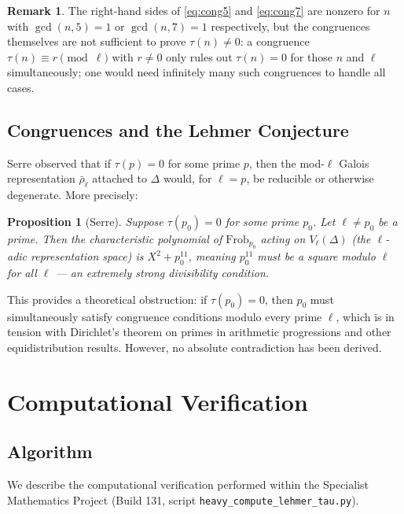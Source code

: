 \documentclass[12pt,a4paper]{amsart}
\newtheorem{proposition}[theorem]{Proposition}
\theoremstyle{definition}
\newtheorem{remark}[theorem]{Remark}
\begin{document}
\begin{remark}
  The right-hand sides of \eqref{eq:cong5} and \eqref{eq:cong7} are nonzero for
  $n$ with $\gcd(n, 5) = 1$ or $\gcd(n, 7) = 1$ respectively, but the congruences
  themselves are not sufficient to prove $\tau(n) \neq 0$: a congruence
  $\tau(n) \equiv r \pmod{\ell}$ with $r \neq 0$ only rules out $\tau(n) = 0$ for
  those $n$ and $\ell$ simultaneously; one would need infinitely many such
  congruences to handle all cases.
\end{remark}

\subsection{Congruences and the Lehmer Conjecture}

Serre \cite{Serre1987} observed that if $\tau(p) = 0$ for some prime $p$, then the
mod-$\ell$ Galois representation $\bar\rho_\ell$ attached to $\Delta$ would, for
$\ell = p$, be reducible or otherwise degenerate. More precisely:

\begin{proposition}[Serre]\label{prop:serre-galois}
  Suppose $\tau(p_0) = 0$ for some prime $p_0$. Let $\ell \neq p_0$ be a prime.
  Then the characteristic polynomial of $\mathrm{Frob}_{p_0}$ acting on
  $V_\ell(\Delta)$ (the $\ell$-adic representation space) is $X^2 + p_0^{11}$,
  meaning $p_0^{11}$ must be a square modulo $\ell$ for all $\ell$ --- an
  extremely strong divisibility condition.
\end{proposition}

This provides a theoretical obstruction: if $\tau(p_0) = 0$, then $p_0$ must
simultaneously satisfy congruence conditions modulo every prime $\ell$, which is
in tension with Dirichlet's theorem on primes in arithmetic progressions and other
equidistribution results. However, no absolute contradiction has been derived.

\section{Computational Verification}

\subsection{Algorithm}

We describe the computational verification performed within the Specialist
Mathematics Project (Build 131, script \texttt{heavy\_compute\_lehmer\_tau.py}).
\end{document}
